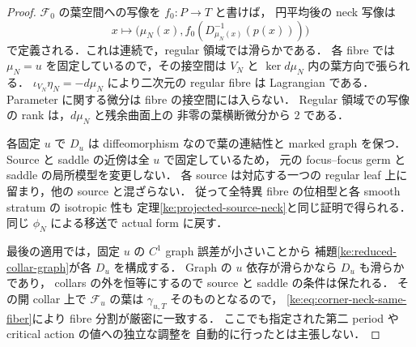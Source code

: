 \begin{proof}
$\mathcal F_0$ の葉空間への写像を $f_0:P\to T$ と書けば，
円平均後の neck 写像は
\[
 x\longmapsto
 \bigl(\mu_N(x),f_0(D_{\mu_N(x)}^{-1}(p(x)))\bigr)
\]
で定義される．これは連続で，regular 領域では滑らかである．
各 fibre では $\mu_N=u$ を固定しているので，その接空間は
$V_N$ と $\ker d\mu_N$ 内の葉方向で張られる．
$\iota_{V_N}\eta_N=-d\mu_N$ により二次元の regular fibre は Lagrangian である．
Parameter に関する微分は fibre の接空間には入らない．
Regular 領域での写像の rank は，$d\mu_N$ と残余曲面上の
非零の葉横断微分から $2$ である．

各固定 $u$ で $D_u$ は diffeomorphism なので葉の連結性と marked graph を保つ．
Source と saddle の近傍は全 $u$ で固定しているため，
元の focus--focus germ と saddle の局所模型を変更しない．
各 source は対応する一つの regular leaf 上に留まり，他の source と混ざらない．
従って全特異 fibre の位相型と各 smooth stratum の isotropic 性も
定理\ref{ke:projected-source-neck}と同じ証明で得られる．
同じ $\phi_N$ による移送で actual form に戻す．

最後の適用では，固定 $u$ の $C^1$ graph 誤差が小さいことから
補題\ref{ke:reduced-collar-graph}が各 $D_u$ を構成する．
Graph の $u$ 依存が滑らかなら $D_u$ も滑らかであり，
collars の外を恒等にするので source と saddle の条件は保たれる．
その開 collar 上で $\mathcal F_u$ の葉は $\gamma_{u,T}$ そのものとなるので，
\eqref{ke:eq:corner-neck-same-fiber}により fibre 分割が厳密に一致する．
ここでも指定された第二 period や critical action の値への独立な調整を
自動的に行ったとは主張しない．
\end{proof}

